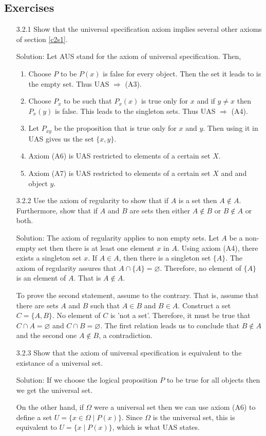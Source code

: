 \subsection{Exercises}
\begin{enumerate}
\item[3.2.1] Show that the universal specification axiom implies several
other axioms of section \ref{c2s1}.
\item[Solution:] Let AUS stand for the axiom of universal specification.
Then,
\begin{enumerate}
\item Choose $P$ to be $P(x)$ is false for every object. Then the set it
leads to is the empty set. Thus UAS $\Rightarrow$ (A3).
\item Choose $P_x$ to be such that $P_x(x)$ is true only for $x$ and if 
$y \ne x$ then $P_x(y)$ is false. This leads to the singleton sets. Thus 
UAS $\Rightarrow$ (A4).
\item Let $P_{xy}$ be the proposition that is true only for $x$ and $y$.
Then using it in UAS gives us the set $\{x, y\}$.
\item Axiom (A6) is UAS restricted to elements of a certain set $X$.
\item Axiom (A7) is UAS restricted to elements of a certain set $X$ and
and object $y$.
\end{enumerate}

\item[3.2.2] Use the axiom of regularity to show that if $A$ is a set
then $A \notin A$. Furthermore, show that if $A$ and $B$ are sets then
either $A \notin B$ or $B \notin A$ or both.
\item[Solution:] The axiom of regularity applies to non empty sets. Let
$A$ be a non-empty set then there is at least one element $x$ in $A$. 
Using axiom (A4), there exists a singleton set ${x}$. If $A \in A$, then
there is a singleton set $\{A\}$. The axiom of regularity assures that
$A \cap \{A\} = \varnothing$. Therefore, no element of $\{A\}$ is an 
element of $A$. That is $A \notin A$.

To prove the second statement, assume to the contrary. That is, assume that
there are sets $A$ and $B$ such that $A \in B$ and $B \in A$. Construct
a set $C = \{A, B\}$. No element of $C$ is 'not a set'. Therefore, it
must be true that $C \cap A = \varnothing$ and $C \cap B = \varnothing$.
The first relation leads us to conclude that $B \notin A$ and the second
one $A \notin B$, a contradiction.

\item[3.2.3] Show that the axiom of universal specification is equivalent
to the existance of a universal set.
\item[Solution:] If we choose the logical proposition $P$ to be true for
all objects then we get the universal set.

On the other hand, if $\Omega$ were a universal set then we can use axiom
(A6) to define a set $U = \{x \in \Omega \;|\; P(x)\}$. Since $\Omega$ is 
the universal set, this is equivalent to $U = \{x\;|\; P(x)\}$, which is
what UAS states.
\end{enumerate}

